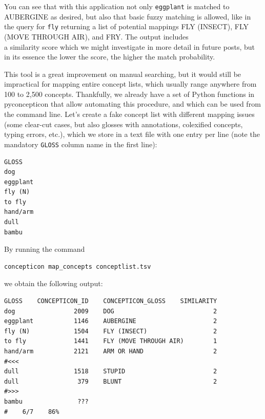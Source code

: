 \documentclass[
  a4paper,
  14pt,
  oneside,
  tablecaptionabove
]{scrbook}
\newcommand{\passthrough}[1]{#1}
\begin{document}
You can see that with this application not only
\passthrough{\lstinline!eggplant!} is matched to AUBERGINE as desired,
but also that basic fuzzy matching is allowed, like in the query for
\passthrough{\lstinline!fly!} returning a list of potential mappings FLY
(INSECT), FLY (MOVE THROUGH AIR), and FRY. The output includes\\
a similarity score which we might investigate in more detail in future
posts, but in its essence the lower the score, the higher the match
probability.

This tool is a great improvement on manual searching, but it would still
be impractical for mapping entire concept lists, which usually range
anywhere from 100 to 2,500 concepts. Thankfully, we already have a set
of Python functions in pyconcepticon that allow automating this
procedure, and which can be used from the command line. Let's create a
fake concept list with different mapping issues (some clear-cut cases,
but also glosses with annotations, colexified concepts, typing errors,
etc.), which we store in a text file with one entry per line (note the
mandatory \passthrough{\lstinline!GLOSS!} column name in the first
line):

\begin{lstlisting}
GLOSS
dog
eggplant
fly (N)
to fly
hand/arm
dull
bambu
\end{lstlisting}

By running the command

\begin{lstlisting}
concepticon map_concepts conceptlist.tsv
\end{lstlisting}

we obtain the following output:

\begin{lstlisting}
GLOSS    CONCEPTICON_ID    CONCEPTICON_GLOSS    SIMILARITY
dog                2009    DOG                           2
eggplant           1146    AUBERGINE                     2
fly (N)            1504    FLY (INSECT)                  2
to fly             1441    FLY (MOVE THROUGH AIR)        1
hand/arm           2121    ARM OR HAND                   2
#<<<
dull               1518    STUPID                        2
dull                379    BLUNT                         2
#>>>
bambu               ???
#    6/7    86%
\end{lstlisting}
\end{document}
